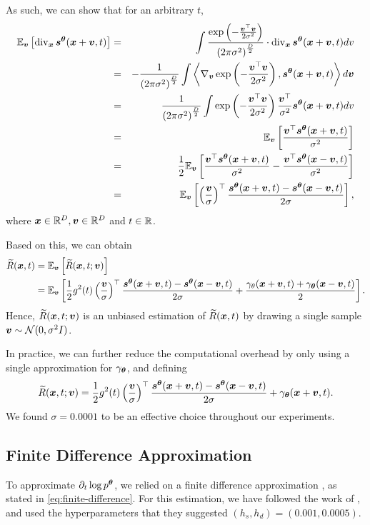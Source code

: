 As such, we can show that for an arbitrary $t$,
\begin{eqnarray}
\mathbb{E}_{{\bm{v}}}\left[\operatorname{div}_{{\bm{x}}} {{\bm{s}}^{\bm{\theta}}}({{\bm{x}}}+{\bm{v}},{t})\right] & = & \int\frac{\exp\left(-\frac{{\bm{v}}^{\top}{\bm{v}}}{2\sigma^{2}}\right)}{\left(2\pi\sigma^{2}\right)^{\frac{D}{2}}}\cdot\operatorname{div}_{{\bm{x}}} {{\bm{s}}^{\bm{\theta}}}({{\bm{x}}}+{\bm{v}},{t})dv\\
 & = & -\frac{1}{\left(2\pi\sigma^{2}\right)^{\frac{D}{2}}}\int\left\langle \nabla_{{\bm{v}}}\exp\left(-\frac{{\bm{v}}^{\top}{\bm{v}}}{2\sigma^{2}}\right),{{\bm{s}}^{\bm{\theta}}}({{\bm{x}}}+{\bm{v}},{t})\right\rangle d{\bm{v}}\\
 & = & \frac{1}{\left(2\pi\sigma^{2}\right)^{\frac{D}{2}}}\int\exp\left(-\frac{{\bm{v}}^{\top}{\bm{v}}}{2\sigma^{2}}\right)\frac{{\bm{v}}^{\top}}{\sigma^{2}}{{\bm{s}}^{\bm{\theta}}}({{\bm{x}}}+{\bm{v}},{t})dv\\
 & = & \mathbb{E}_{{\bm{v}}}\left[\frac{{\bm{v}}^{\top}{{\bm{s}}^{\bm{\theta}}}({{\bm{x}}}+{\bm{v}}, {t})}{\sigma^{2}}\right]\\
 & = & \frac{1}{2}\mathbb{E}_{{\bm{v}}}\left[\frac{{\bm{v}}^{\top}{{\bm{s}}^{\bm{\theta}}}({{\bm{x}}}+{\bm{v}},{t})}{\sigma^{2}}-\frac{{\bm{v}}^{\top}{{\bm{s}}^{\bm{\theta}}}({{\bm{x}}}-{\bm{v}},{t})}{\sigma^{2}}\right]\\
 & = & \mathbb{E}_{{\bm{v}}}\left[\left(\frac{{\bm{v}}}{\sigma}\right)^{\top}\frac{{{\bm{s}}^{\bm{\theta}}}({{\bm{x}}}+{\bm{v}},{t})-{{\bm{s}}^{\bm{\theta}}}({{\bm{x}}}-{\bm{v}},{t})}{2\sigma}\right],
\end{eqnarray}
where ${{\bm{x}}} \in \mathbb{R}^D, {\bm{v}} \in \mathbb{R}^D$ and $t \in \mathbb{R}$.

Based on this, we can obtain
\begin{align}
    \widetilde{R}({{\bm{x}}},{t}) &= \mathbb{E}_{{\bm{v}}}\left[ \widetilde{R}({{\bm{x}}}, {t}; {\bm{v}}) \right] \\
    &= \mathbb{E}_{{\bm{v}}}\left[ \frac{1}{2}{g}^{2}({t}) \left(\frac{{\bm{v}}}{\sigma}\right)^{\top}\frac{{{\bm{s}}^{\bm{\theta}}}({{\bm{x}}}+{\bm{v}},{t})-{{\bm{s}}^{\bm{\theta}}}({{\bm{x}}}-{\bm{v}},{t})}{2\sigma}  +\frac{\gamma_{\theta}({{\bm{x}}}+{\bm{v}},{t})+\gamma_{\bm{\theta}}({{\bm{x}}}-{\bm{v}},{t})}{2} \right].
\end{align}
Hence, $\widetilde{R}({{\bm{x}}},{t};{\bm{v}})$ is an unbiased estimation of $\widetilde{R}({{\bm{x}}},{t})$ by drawing a single sample ${\bm{v}} \sim{\mathcal{N}}(0,\sigma^2 I)$.

In practice, we can further reduce the computational overhead by only using a single approximation for $\gamma_{\bm{\theta}}$, and defining
\begin{equation}
\widetilde{R}({{\bm{x}}},{t};{\bm{v}}) = \frac{1}{2}{g}^{2}({t}) \left(\frac{{\bm{v}}}{\sigma}\right)^{\top}\frac{{{\bm{s}}^{\bm{\theta}}}({{\bm{x}}}+{\bm{v}},{t})-{{\bm{s}}^{\bm{\theta}}}({{\bm{x}}}-{\bm{v}},{t})}{2\sigma} +\gamma_{\bm{\theta}}({{\bm{x}}}+{\bm{v}},{t}).
\end{equation}
We found $\sigma=0.0001$ to be an effective choice throughout our experiments.

\subsection{Finite Difference Approximation}
To approximate $\partial_{t} \log p^{\bm{\theta}}$, we relied on a finite difference approximation \cite{fornberg1988}, as stated in \cref{eq:finite-difference}. For this estimation, we have followed the work of \cite{lai2023}, and used the hyperparameters that they suggested $(h_s, h_d) = (0.001, 0.0005)$.

